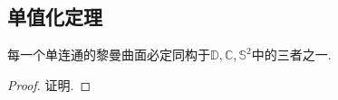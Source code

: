 \subsection{单值化定理}
\begin{theorem}[单值化定理]
    每一个单连通的黎曼曲面必定同构于$\mathbb{D}, \mathbb{C}, \mathbb{S}^2$中的三者之一.
\end{theorem}
\begin{proof}
    证明.
\end{proof}
